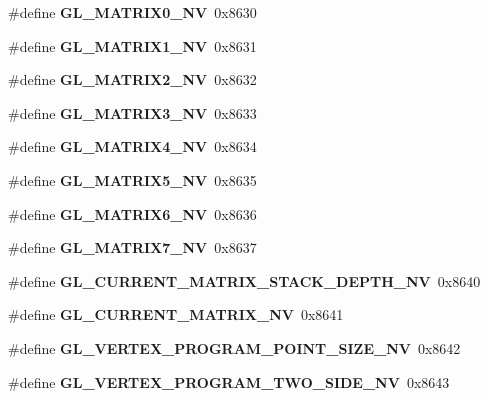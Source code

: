 \begin{DoxyCompactItemize}
\item 
\#define {\bfseries G\+L\+\_\+\+M\+A\+T\+R\+I\+X0\+\_\+\+N\+V}~0x8630\label{_s_d_l__opengl_8h_ab15e7ff788b496109136f3d10ae7ff18}

\item 
\#define {\bfseries G\+L\+\_\+\+M\+A\+T\+R\+I\+X1\+\_\+\+N\+V}~0x8631\label{_s_d_l__opengl_8h_a8ebe45a1754be4f1f4ea4fe3ea556736}

\item 
\#define {\bfseries G\+L\+\_\+\+M\+A\+T\+R\+I\+X2\+\_\+\+N\+V}~0x8632\label{_s_d_l__opengl_8h_ab8f1d3faa5a8b0b6e8b53e1a2c5affe6}

\item 
\#define {\bfseries G\+L\+\_\+\+M\+A\+T\+R\+I\+X3\+\_\+\+N\+V}~0x8633\label{_s_d_l__opengl_8h_a1d9c44d10393450b4ec2f3efef7a6b56}

\item 
\#define {\bfseries G\+L\+\_\+\+M\+A\+T\+R\+I\+X4\+\_\+\+N\+V}~0x8634\label{_s_d_l__opengl_8h_ad5543d563cc5fe4290f252eba28177c4}

\item 
\#define {\bfseries G\+L\+\_\+\+M\+A\+T\+R\+I\+X5\+\_\+\+N\+V}~0x8635\label{_s_d_l__opengl_8h_a894ebe705df187ee6d3be4d5cdf9f954}

\item 
\#define {\bfseries G\+L\+\_\+\+M\+A\+T\+R\+I\+X6\+\_\+\+N\+V}~0x8636\label{_s_d_l__opengl_8h_af51dfb760407db116f98c5f6710f535f}

\item 
\#define {\bfseries G\+L\+\_\+\+M\+A\+T\+R\+I\+X7\+\_\+\+N\+V}~0x8637\label{_s_d_l__opengl_8h_a9b1f62838126bd3206a9aa764cd8ed67}

\item 
\#define {\bfseries G\+L\+\_\+\+C\+U\+R\+R\+E\+N\+T\+\_\+\+M\+A\+T\+R\+I\+X\+\_\+\+S\+T\+A\+C\+K\+\_\+\+D\+E\+P\+T\+H\+\_\+\+N\+V}~0x8640\label{_s_d_l__opengl_8h_a69a844878a8cd9b0fb5dceb3b1a2df22}

\item 
\#define {\bfseries G\+L\+\_\+\+C\+U\+R\+R\+E\+N\+T\+\_\+\+M\+A\+T\+R\+I\+X\+\_\+\+N\+V}~0x8641\label{_s_d_l__opengl_8h_a8562500ab7885a0efba03e3e8d02722d}

\item 
\#define {\bfseries G\+L\+\_\+\+V\+E\+R\+T\+E\+X\+\_\+\+P\+R\+O\+G\+R\+A\+M\+\_\+\+P\+O\+I\+N\+T\+\_\+\+S\+I\+Z\+E\+\_\+\+N\+V}~0x8642\label{_s_d_l__opengl_8h_ad9217a671972a303a8b863a253f5b631}

\item 
\#define {\bfseries G\+L\+\_\+\+V\+E\+R\+T\+E\+X\+\_\+\+P\+R\+O\+G\+R\+A\+M\+\_\+\+T\+W\+O\+\_\+\+S\+I\+D\+E\+\_\+\+N\+V}~0x8643\label{_s_d_l__opengl_8h_a007ab043691b0dbc1b40b5c3cfb6cb3e}


\end{DoxyCompactItemize}
